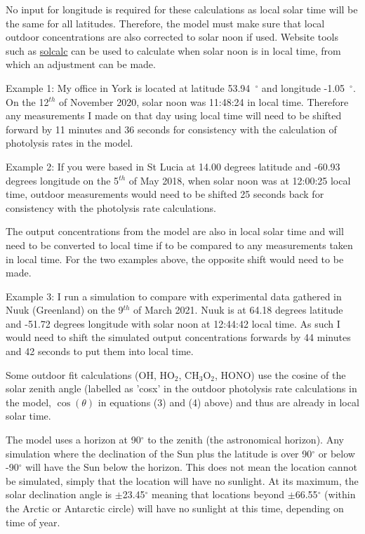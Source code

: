 \documentclass[a4paper]{refart}
\begin{document}
\label{Outdoor concentrations and time}

No input for longitude is required for these calculations as local solar time will be the same for all latitudes. Therefore, the model must make sure that local outdoor concentrations are also corrected to solar noon if used. Website tools such as \href{https://www.esrl.noaa.gov/gmd/grad/solcalc/}{solcalc} can be used to calculate when solar noon is in local time, from which an adjustment can be made. 

Example 1: My office in York is located at latitude 53.94~$^{\circ}$ and longitude -1.05~$^{\circ}$. On the 12$^{th}$ of November 2020, solar noon was 11:48:24 in local time. Therefore any measurements I made on that day using local time will need to be shifted forward by 11 minutes and 36 seconds for consistency with the calculation of photolysis rates in the model.

Example 2: If you were based in St Lucia at 14.00 degrees latitude and -60.93 degrees longitude on the 5$^{th}$ of May 2018, when solar noon was at 12:00:25 local time, outdoor measurements would need to be shifted 25 seconds back for consistency with the photolysis rate calculations.

The output concentrations from the model are also in local solar time and will need to be converted to local time if to be compared to any measurements taken in local time. For the two examples above, the opposite shift would need to be made. 

Example 3: I run a simulation to compare with experimental data gathered in Nuuk (Greenland) on the 9$^{th}$ of March 2021. Nuuk is at 64.18 degrees latitude and -51.72 degrees longitude with solar noon at 12:44:42 local time. As such I would need to shift the simulated output concentrations forwards by 44 minutes and 42 seconds to put them into local time.

Some outdoor fit calculations (OH, HO$_2$, CH$_3$O$_2$, HONO) use the cosine of the solar zenith angle (labelled as 'cosx' in the outdoor photolysis rate calculations in the model, $\cos(\theta)$ in equations (3) and (4) above) and thus are already in local solar time.


The model uses a horizon at 90$^{\circ}$ to the zenith (the astronomical horizon). Any simulation where the declination of the Sun plus the latitude is over 90$^{\circ}$ or below -90$^{\circ}$ will have the Sun below the horizon. This does not mean the location cannot be simulated, simply that the location will have no sunlight. At its maximum, the solar declination angle is $\pm$23.45$^{\circ}$ meaning that locations beyond $\pm$66.55$^{\circ}$ (within the Arctic or Antarctic circle) will have no sunlight at this time, depending on time of year.
\end{document}
